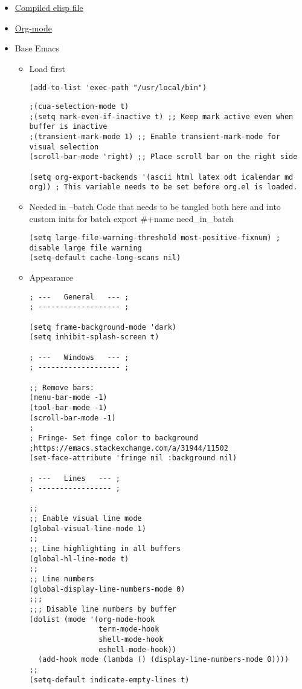 \documentclass{article}
\begin{document}
\begin{itemize}
\item \href{config/public\_emacs\_config.el}{Compiled elisp file}
\label{sec:org654781f}
\item \hyperref[sec:org57a025f]{Org-mode}
\label{sec:orgc75778f}
\item Base Emacs
\label{sec:org7a830c9}
\begin{itemize}
\item Load first
\label{sec:org4941bf1}
\begin{verbatim}
(add-to-list 'exec-path "/usr/local/bin")
\end{verbatim}

\begin{verbatim}
;(cua-selection-mode t)
;(setq mark-even-if-inactive t) ;; Keep mark active even when buffer is inactive
;(transient-mark-mode 1) ;; Enable transient-mark-mode for visual selection
(scroll-bar-mode 'right) ;; Place scroll bar on the right side

(setq org-export-backends '(ascii html latex odt icalendar md org)) ; This variable needs to be set before org.el is loaded.
\end{verbatim}
\item Needed in --batch
\label{sec:orgb9772e7}
Code that needs to be tangled both here and into custom inits for batch export
\#+name need\_in\_batch 
\begin{verbatim}
(setq large-file-warning-threshold most-positive-fixnum) ; disable large file warning
(setq-default cache-long-scans nil)
\end{verbatim}

\item Appearance
\label{sec:orgbf9a371}
\begin{verbatim}
; ---   General   --- ;
; ------------------- ;

(setq frame-background-mode 'dark)
(setq inhibit-splash-screen t)

; ---   Windows   --- ;
; ------------------- ;

;; Remove bars:
(menu-bar-mode -1)
(tool-bar-mode -1)
(scroll-bar-mode -1)
;
; Fringe- Set finge color to background
;https://emacs.stackexchange.com/a/31944/11502
(set-face-attribute 'fringe nil :background nil)

; ---   Lines   --- ;
; ----------------- ;

;;
;; Enable visual line mode
(global-visual-line-mode 1)
;;
;; Line highlighting in all buffers
(global-hl-line-mode t)
;;
;; Line numbers
(global-display-line-numbers-mode 0)
;;;
;;; Disable line numbers by buffer
(dolist (mode '(org-mode-hook
                term-mode-hook
                shell-mode-hook
                eshell-mode-hook))
  (add-hook mode (lambda () (display-line-numbers-mode 0))))
;;
(setq-default indicate-empty-lines t)


\end{verbatim}
\end{itemize}
\end{itemize}
\end{document}
